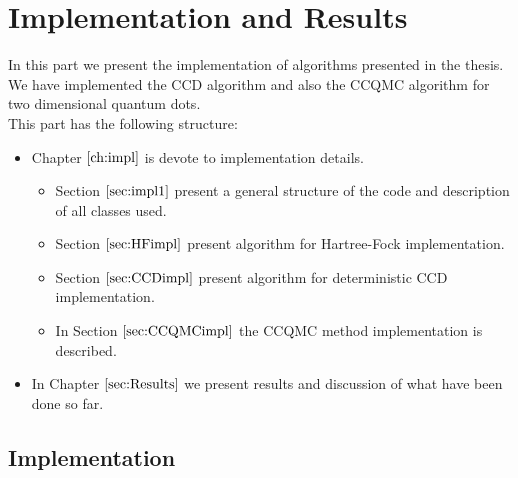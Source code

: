 \documentclass[twoside,english]{uiofysmaster}
\theoremstyle{definition}
\begin{document}
\part{Implementation and Results}
In this part we present the implementation of algorithms presented in the thesis. We have implemented the CCD algorithm and also the CCQMC algorithm for two dimensional quantum dots. \\
This part has the following structure:\\
\begin{itemize}
\item Chapter $\ref{ch:impl}$ is devote to implementation details.
\begin{itemize}
\item Section $\ref{sec:impl1}$ present a general structure of the code and description of all classes used.
\item Section $\ref{sec:HFimpl}$ present algorithm for Hartree-Fock implementation.
\item Section $\ref{sec:CCDimpl}$ present algorithm for deterministic CCD implementation.
\item In Section $\ref{sec:CCQMCimpl}$ the CCQMC method implementation is described.
\end{itemize}
\item In Chapter $\ref{sec:Results}$ we present results and discussion of what have been done so far.

\end{itemize}
\chapter{Implementation}\label{ch:impl}
\end{document}
